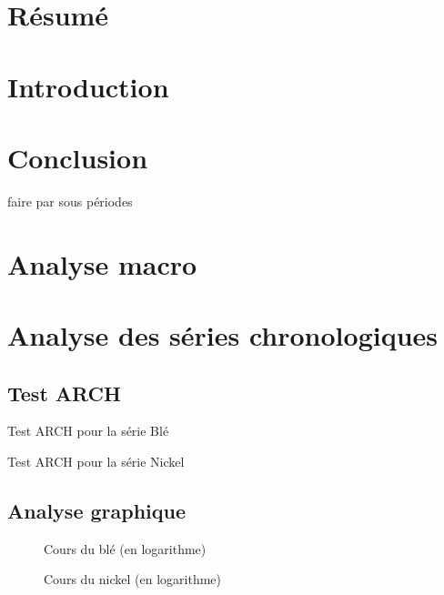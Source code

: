\documentclass[12pt,a4paper]{article}
\begin{document}
\clearpage
{}
\pagestyle{fancy}
\fancyhead{}
\fancyfoot{}
\fancyfoot[C]{\thepage}
\section*{Résumé}
\renewcommand\contentsname{Sommaire}
\tableofcontents



\section*{Introduction}






\section*{Conclusion}


faire par sous périodes


\appendix
\renewcommand{\thetable}{\thesection.\arabic{table}}
\renewcommand{\thefigure}{\thesection.\arabic{figure}}
\section{Analyse macro}
\setcounter{table}{0}
\setcounter{figure}{0}

\section{Analyse des séries chronologiques}
\setcounter{table}{0}
\setcounter{figure}{0}
\subsection{Test ARCH}\label{appendix:arch_test}
\begin{table}[H]
    \centering
    \caption{Test ARCH pour la série Blé}
    \label{tab:hetero_ble}
    \sffamily
    
\end{table}

\begin{table}[H]
    \centering
    \caption{Test ARCH pour la série Nickel}
    \label{tab:hetero_nickel}
    \sffamily
    
\end{table}

\subsection{Analyse graphique}
\begin{figure}[H]
    \centering
    \resizebox{0.8\textwidth}{!}{}
    \caption{Cours du blé (en logarithme)}
    \label{fig:ble_log}
\end{figure}
\begin{figure}[H]
    \centering
    \resizebox{0.8\textwidth}{!}{}
    \caption{Cours du nickel (en logarithme)}
    \label{fig:nickel_log}
\end{figure}
\end{document}
